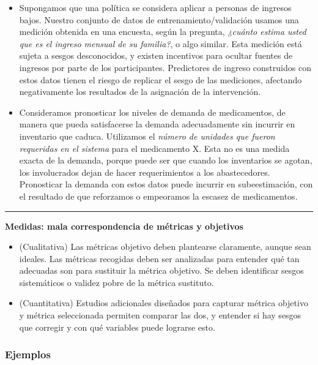 \documentclass[
]{book}
\let\BeginKnitrBlock\begin \let\EndKnitrBlock\end
\begin{document}
\begin{itemize}
\item
  Supongamos que una política se considera aplicar a personas de ingresos bajos. Nuestro conjunto de datos de entrenamiento/validación usamos una medición obtenida en una encuesta,
  según la pregunta, \emph{¿cuánto estima usted que es el ingreso mensual de su familia?}, o algo similar.
  Esta medición está sujeta a sesgos desconocidos, y existen incentivos para ocultar fuentes de ingresos
  por parte de los participantes. Predictores de ingreso construidos con estos datos tienen el riesgo
  de replicar el sesgo de las mediciones, afectando negativamente los resultados de la asignación de la intervención.
\item
  Consideramos pronosticar los niveles de demanda de medicamentos, de manera que pueda satisfacerse la demanda adecuadamente sin incurrir en inventario que caduca. Utilizamos el
  \emph{número de unidades que fueron requeridas en el sistema} para el medicamento X. Esta no es una medida
  exacta de la demanda, porque puede ser que cuando los inventarios se agotan, los involucrados dejan de hacer requerimientos a los abastecedores. Pronosticar la demanda con estos datos puede incurrir en
  subeestimación, con el resultado de que reforzamos o empeoramos la escasez de medicamentos.
\end{itemize}

\begin{center}\rule{0.5\linewidth}{0.5pt}\end{center}

\BeginKnitrBlock{rmdtip}
\textbf{Medidas: mala correspondencia de métricas y objetivos}

\begin{itemize}
\item
  (Cualitativa) Las métricas objetivo deben plantearse claramente, aunque sean ideales. Las métricas
  recogidas deben ser analizadas para entender qué tan adecuadas son para sustituir la métrica objetivo.
  Se deben identificar sesgos sistemáticos o validez pobre de la métrica sustituto.
\item
  (Cuantitativa) Estudios adicionales diseñados para capturar métrica objetivo y métrica seleccionada permiten comparar las dos, y entender si hay sesgos que corregir y con qué variables puede lograrse esto.
\end{itemize}
\EndKnitrBlock{rmdtip}

\hypertarget{ejemplos-1}{%
\subsubsection*{Ejemplos}\label{ejemplos-1}}
\end{document}
